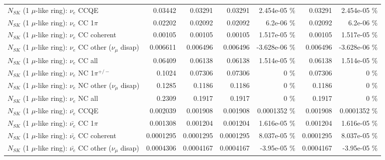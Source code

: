 \begin{table}
\begin{tabular}{| l | r | r | r  r | r  r |}
\hline
\hline
\hline
                                      $N_{SK}$ (1 $\mu$-like ring): $\nu_e$ CCQE &         0.03442 &         0.03291 &         0.03291 & 2.454e-05 \%  &         0.03291 & 2.454e-05 \%  \\ 
                                 $N_{SK}$ (1 $\mu$-like ring): $\nu_e$ CC 1$\pi$ &         0.02202 &         0.02092 &         0.02092 &  6.2e-06 \%  &         0.02092 &  6.2e-06 \%  \\ 
                               $N_{SK}$ (1 $\mu$-like ring): $\nu_e$ CC coherent &         0.00105 &         0.00105 &         0.00105 & 1.517e-05 \%  &         0.00105 & 1.517e-05 \%  \\ 
                $N_{SK}$ (1 $\mu$-like ring): $\nu_e$ CC other ($\nu_\mu$ disap) &        0.006611 &        0.006496 &        0.006496 & -3.628e-06 \%  &        0.006496 & -3.628e-06 \%  \\ 
                                  $N_{SK}$ (1 $\mu$-like ring): $\nu_{e}$ CC all &         0.06409 &         0.06138 &         0.06138 & 1.514e-05 \%  &         0.06138 & 1.514e-05 \%  \\ 
\hline
                           $N_{SK}$ (1 $\mu$-like ring): $\nu_e$ NC 1$\pi^{+/-}$ &          0.1024 &         0.07306 &         0.07306 &        0 \%  &         0.07306 &        0 \%  \\ 
                $N_{SK}$ (1 $\mu$-like ring): $\nu_e$ NC other ($\nu_\mu$ disap) &          0.1285 &          0.1186 &          0.1186 &        0 \%  &          0.1186 &        0 \%  \\ 
                                  $N_{SK}$ (1 $\mu$-like ring): $\nu_{e}$ NC all &          0.2309 &          0.1917 &          0.1917 &        0 \%  &          0.1917 &        0 \%  \\ 
\hline
\hline
\hline
                                $N_{SK}$ (1 $\mu$-like ring): $\bar{\nu_e}$ CCQE &        0.002039 &        0.001908 &        0.001908 & 0.0001352 \%  &        0.001908 & 0.0001352 \%  \\ 
                           $N_{SK}$ (1 $\mu$-like ring): $\bar{\nu_e}$ CC 1$\pi$ &        0.001308 &        0.001204 &        0.001204 & 1.616e-05 \%  &        0.001204 & 1.616e-05 \%  \\ 
                         $N_{SK}$ (1 $\mu$-like ring): $\bar{\nu_e}$ CC coherent &       0.0001295 &       0.0001295 &       0.0001295 & 8.037e-05 \%  &       0.0001295 & 8.037e-05 \%  \\ 
          $N_{SK}$ (1 $\mu$-like ring): $\bar{\nu_e}$ CC other ($\nu_\mu$ disap) &       0.0004306 &       0.0004167 &       0.0004167 & -3.95e-05 \%  &       0.0004167 & -3.95e-05 \%  \\ 

\end{tabular}
\end{table}

